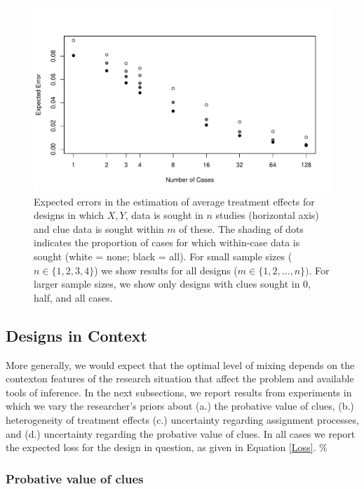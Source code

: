 \documentclass[12pt,]{book}
\begin{document}
\begin{figure}[h!]
\centering
\includegraphics[width=\textwidth]{Figures/m_or_n.pdf}
\caption{{Expected errors in the estimation of average treatment effects for designs in which $X, Y$, data is sought in $n$ studies (horizontal axis) and clue data is sought within $m$ of these. The shading of dots indicates the proportion of cases for which within-case data is sought (white = none; black = all). For small sample sizes ($n \in \{1,2,3,4\}$) we show results for all designs ($m \in \{1,2,\dots, n\})$. For larger sample sizes, we show only designs with clues sought in 0, half, and all cases.}}
\label{morn}
\end{figure}

\subsection{Designs in Context}

More generally, we would expect that the optimal level of mixing depends on the context\textbar{}on features of the research situation that affect the problem and available tools of inference. In the next subsections, we report results from experiments in which we vary the researcher's priors about (a.) the probative value of clues, (b.) heterogeneity of treatment effects (c.) uncertainty regarding assignment processes, and (d.) uncertainty regarding the probative value of clues. In all cases we report the expected loss for the design in question, as given in Equation \ref{Loss}. \%

\subsubsection{Probative value of clues}
\end{document}
